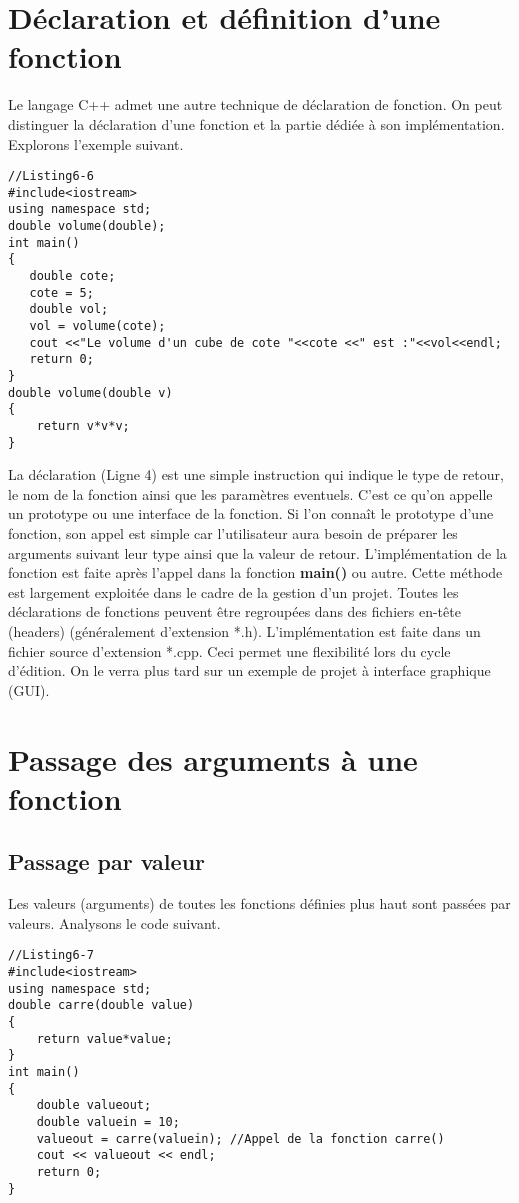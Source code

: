 \documentclass[a4paper, oneside,11pt]{book}
\begin{document}
\section{D\'eclaration et d\'efinition d'une fonction}

Le langage C++ admet une autre technique de d\'eclaration de fonction. On peut distinguer la d\'eclaration d'une fonction et la partie d\'edi\'ee \`a son impl\'ementation. 
Explorons l'exemple suivant.

\begin{lstlisting}
//Listing6-6
#include<iostream>
using namespace std;
double volume(double);
int main()
{
   double cote;
   cote = 5;
   double vol;
   vol = volume(cote);
   cout <<"Le volume d'un cube de cote "<<cote <<" est :"<<vol<<endl;
   return 0;
}
double volume(double v)
{
    return v*v*v;
}
\end{lstlisting}

La d\'eclaration (Ligne 4)  est une simple instruction qui indique le type de retour,
le nom de la fonction ainsi que les param\`etres eventuels. C'est ce qu'on appelle 
un prototype ou une interface de la fonction. Si l'on conna\^it le prototype d'une
fonction, son appel est simple car l'utilisateur aura besoin de pr\'eparer les
arguments suivant leur type ainsi que la valeur de retour. L'impl\'ementation de 
la fonction est faite apr\`es l'appel dans la fonction \textbf{main()} ou autre. 
Cette m\'ethode est largement exploit\'ee dans le cadre de la gestion d'un projet. Toutes les d\'eclarations de fonctions peuvent \^etre regroup\'ees dans des fichiers 
en-t\^ete (headers) (g\'en\'eralement d'extension *.h). L'impl\'ementation est 
faite dans un fichier source d'extension *.cpp. Ceci permet une flexibilit\'e lors 
du cycle d'\'edition. On le verra plus tard sur un exemple de projet \`a 
interface graphique (GUI).


\section{Passage des arguments \`a une fonction}

\subsection{Passage par valeur}
Les valeurs (arguments) de toutes les fonctions d\'efinies plus haut sont pass\'ees par valeurs. Analysons le code suivant.

\begin{lstlisting}
//Listing6-7
#include<iostream>
using namespace std;
double carre(double value)
{
    return value*value;
}
int main()
{
    double valueout;
    double valuein = 10;
    valueout = carre(valuein); //Appel de la fonction carre()
    cout << valueout << endl;
    return 0;
}
\end{lstlisting}
\end{document}
